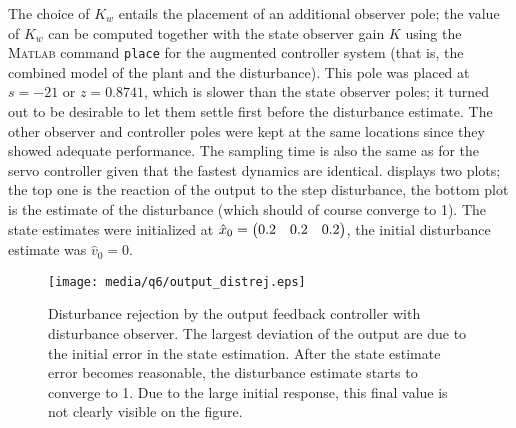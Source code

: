 The choice of $K_w$ entails the placement of an additional observer pole; the value of $K_w$ can be computed together with the state observer gain $K$ using the \textsc{Matlab} command \texttt{place} for the augmented controller system (that is, the combined model of the plant and the disturbance). This pole was placed at $s = -21$ or $z = 0.8741$, which is slower than the state observer poles; it turned out to be desirable to let them settle first before the disturbance estimate. The other observer and controller poles were kept at the same locations since they showed adequate performance. The sampling time is also the same as for the servo controller given that the fastest dynamics are identical.
 displays two plots; the top one is the reaction of the output to the step disturbance, the bottom plot is the estimate of the disturbance (which should of course converge to 1). The state estimates were initialized at $\hat{x}_0 = \mqty(0.2 & 0.2 & 0.2)$, the initial disturbance estimate was $\hat{v}_0 = 0$.
\begin{figure}[ht!]
    \centering
    \texttt{[image: media/q6/output\_distrej.eps]}
    \caption{Disturbance rejection by the output feedback controller with disturbance observer. The largest deviation of the output are due to the initial error in the state estimation. After the state estimate error becomes reasonable, the disturbance estimate starts to converge to 1. Due to the large initial response, this final value is not clearly visible on the figure.}
    \label{fig:q6_output_distrej}
\end{figure}
\FloatBarrier


